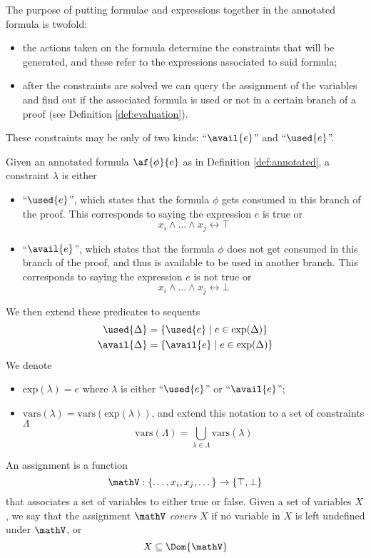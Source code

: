 The purpose of putting formulae and expressions together in the annotated formula is twofold:
\begin{itemize}
	\item the actions taken on the formula determine the constraints that will be generated, and these refer to the expressions associated to said formula;
	\item after the constraints are solved we can query the assignment of the variables and find out if the associated formula is used or not in a certain branch of a proof (see Definition \ref{def:evaluation}).
\end{itemize}
These constraints may be only of two kinds: ``$\avail{e}$'' and ``$\used{e}$''.
\begin{define}[Constraints]
	\label{def:constraints}
	Given an annotated formula $\af{\phi}{e}$ as in Definition \ref{def:annotated}, a constraint $\lambda$ is either
	\begin{itemize}
		\item ``$\used{e}$'', which states that the formula $\phi$ gets consumed in this branch of the proof.
			This corresponds to saying the expression $e$ is true or
			$$ x_i \wedge \dots \wedge x_j \leftrightarrow \top $$
		\item ``$\avail{e}$'', which states that the formula $\phi$ does not get consumed in this branch of the proof, and thus is available to be used in another branch.
			This corresponds to saying the expression $e$ is not true or
			$$ x_i \wedge \dots \wedge x_j \leftrightarrow \bot $$
	\end{itemize}
	We then extend these predicates to sequents
	\begin{align*}
		\used{\Delta} &= \{ \used{e} \mid e \in \mathrm{exp}(\Delta) \} \\
		\avail{\Delta} &= \{ \avail{e} \mid e \in \mathrm{exp}(\Delta) \}
	\end{align*}
	We denote
	\begin{itemize}
		\item $\mathrm{exp}(\lambda) = e$ where $\lambda$ is either ``$\used{e}$'' or ``$\avail{e}$'';
		\item $\mathrm{vars}(\lambda) = \mathrm{vars}(\mathrm{exp}(\lambda))$, and extend this notation to a set of constraints $\Lambda$
			$$ \mathrm{vars}(\Lambda) = \bigcup_{\lambda \in \Lambda} \mathrm{vars}(\lambda) $$
	\end{itemize}
\end{define}
\begin{define}[Assignment]
	\label{def:assignment}
	An assignment is a function
	$$ \mathV : \{ \dots, x_i, x_j, \dots \} \rightarrow \{ \top, \bot \} $$
	that associates a set of variables to either true or false.
	Given a set of variables $X$, we say that the assignment $\mathV$ \textit{covers} $X$ if no variable in $X$ is left undefined under $\mathV$, or
	$$ X \subseteq \Dom{\mathV} $$
\end{define}
